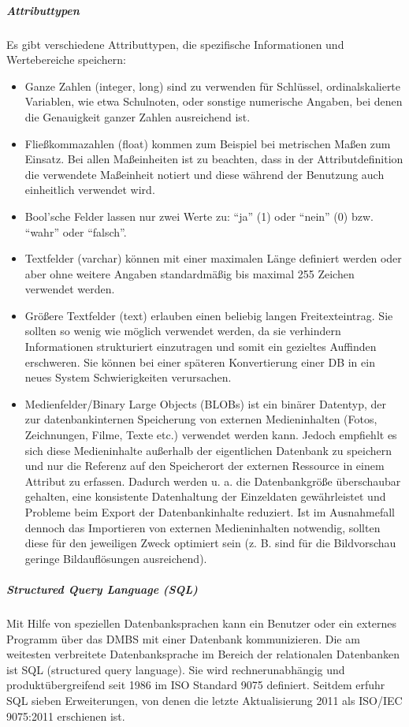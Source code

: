 \subparagraph{Attributtypen}
Es gibt verschiedene Attributtypen, die spezifische Informationen und Wertebereiche speichern:
\begin{itemize}
	\item Ganze Zahlen (integer, long) sind zu verwenden für Schlüssel, ordinalskalierte Variablen, wie etwa Schulnoten, oder sonstige numerische Angaben, bei denen die Genauigkeit ganzer Zahlen ausreichend ist.
	\item Fließkommazahlen (float) kommen zum Beispiel bei metrischen Maßen zum Einsatz. Bei allen Maßeinheiten ist zu beachten, dass in der Attributdefinition die verwendete Maßeinheit notiert und diese während der Benutzung auch einheitlich verwendet wird.
	\item Bool'sche Felder lassen nur zwei Werte zu: "`ja"' (1) oder "`nein"' (0) bzw. "`wahr"' oder "`falsch"'.
	\item Textfelder (varchar) können mit einer maximalen Länge definiert werden oder aber ohne weitere Angaben standardmäßig bis maximal 255 Zeichen verwendet werden. 
	\item Größere Textfelder (text) erlauben einen beliebig langen Freitexteintrag. Sie sollten so wenig wie möglich verwendet werden, da sie verhindern Informationen strukturiert einzutragen und somit ein gezieltes Auffinden erschweren. Sie können bei einer späteren Konvertierung einer DB in ein neues System Schwierigkeiten verursachen.
	\item Medienfelder/Binary Large Objects (BLOBs) ist ein binärer Datentyp, der zur datenbankinternen Speicherung von externen Medieninhalten (Fotos, Zeichnungen, Filme, Texte etc.) verwendet werden kann. Jedoch empfiehlt es sich diese Medieninhalte außerhalb der eigentlichen Datenbank zu speichern und nur die Referenz auf den Speicherort der externen Ressource in einem Attribut zu erfassen. Dadurch werden u. a. die Datenbankgröße überschaubar gehalten, eine konsistente Datenhaltung der Einzeldaten gewährleistet und Probleme beim Export der Datenbankinhalte reduziert. Ist im Ausnahmefall dennoch das Importieren von externen Medieninhalten notwendig, sollten diese für den jeweiligen Zweck optimiert sein (z. B. sind für die Bildvorschau geringe Bildauflösungen ausreichend).
\end{itemize}

\subparagraph{Structured Query Language (SQL)}
Mit Hilfe von speziellen Datenbanksprachen kann ein Benutzer oder ein externes Programm über das DMBS mit einer Datenbank kommunizieren. Die am weitesten verbreitete Datenbanksprache im Bereich der relationalen Datenbanken ist SQL (structured query language). Sie wird rechnerunabhängig und produktübergreifend seit 1986 im ISO Standard 9075 definiert. Seitdem erfuhr SQL sieben Erweiterungen, von denen die letzte Aktualisierung 2011 als ISO/IEC 9075:2011 erschienen ist.

